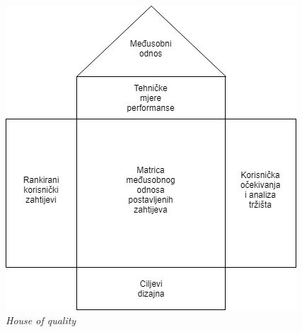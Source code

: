 \documentclass[12pt]{article}
\begin{document}
\begin{figure}[!h]
\centering
\includegraphics[scale=0.8]{hoq}
\caption{\textit{House of quality}}
\label{hoq}
\end{figure}
 
\end{document}
